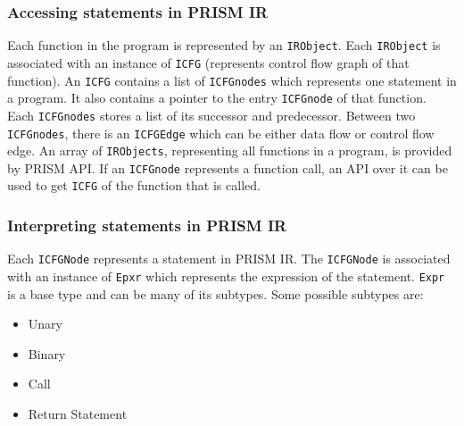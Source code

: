 \documentclass[11pt,a4paper,openright]{report}
\begin{document}
\subsubsection{Accessing statements in PRISM IR}
Each function in the program is represented by an \texttt{IRObject}. Each \texttt{IRObject} is associated with an instance of \texttt{ICFG} (represents control flow graph of that function).
An \texttt{ICFG} contains a list of \texttt{ICFGnodes} which represents one statement in a program. It also contains a pointer to the entry \texttt{ICFGnode} of that function.
Each \texttt{ICFGnodes} stores a list of its successor and predecessor. Between two \texttt{ICFGnodes}, there is an \texttt{ICFGEdge} which can be either data flow or
control flow edge. An array of \texttt{IRObjects}, representing all functions in a program, is provided by PRISM API. If an \texttt{ICFGnode} represents a
function call, an API over it can be used to get \texttt{ICFG} of the function that is called.

\subsubsection{Interpreting statements in PRISM IR}
Each \texttt{ICFGNode} represents a statement in PRISM IR. The \texttt{ICFGNode} is associated with an instance of \texttt{Epxr} which represents the expression of the 
statement. \texttt{Expr} is a base type and can be many of its subtypes. Some possible subtypes are: 
\begin{itemize}
 \item Unary
 \item Binary
 \item Call
 \item Return Statement
\end{itemize}
\end{document}
